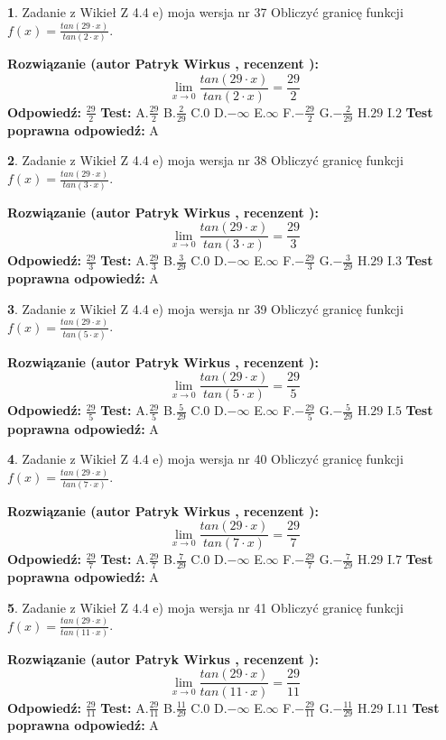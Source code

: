 \documentclass[12pt, a4paper]{article}
\theoremstyle{definition} %
\newtheorem{zad}{}
\newcommand{\zadStart}[1]{\begin{zad}#1\newline}
\newcommand{\zadStop}{\end{zad}}
\newcommand{\rozwStart}[2]{\noindent \textbf{Rozwiązanie (autor #1 , recenzent #2): }\newline}
\newcommand{\rozwStop}{\newline}
\newcommand{\odpStart}{\noindent \textbf{Odpowiedź:}\newline}
\newcommand{\odpStop}{\newline}
\newcommand{\testStart}{\noindent \textbf{Test:}\newline}
\newcommand{\testStop}{\newline}
\newcommand{\kluczStart}{\noindent \textbf{Test poprawna odpowiedź:}\newline}
\newcommand{\kluczStop}{\newline}
\begin{document}
\zadStart{Zadanie z Wikieł Z 4.4 e) moja wersja nr 37}
Obliczyć granicę funkcji $f(x)=\frac{tan(29\cdot x)}{tan(2\cdot x)}$.
\zadStop
\rozwStart{Patryk Wirkus}{}
$$\lim\limits_{x\to 0}\frac{tan(29\cdot x)}{tan(2\cdot x)}=
\frac{29}{2}$$
\rozwStop
\odpStart
$\frac{29}{2}$
\odpStop
\testStart
A.$\frac{29}{2}$
B.$\frac{2}{29}$
C.$0$
D.$-\infty$
E.$\infty$
F.$-\frac{29}{2}$
G.$-\frac{2}{29}$
H.$29$
I.$2$
\testStop
\kluczStart
A
\kluczStop



\zadStart{Zadanie z Wikieł Z 4.4 e) moja wersja nr 38}
Obliczyć granicę funkcji $f(x)=\frac{tan(29\cdot x)}{tan(3\cdot x)}$.
\zadStop
\rozwStart{Patryk Wirkus}{}
$$\lim\limits_{x\to 0}\frac{tan(29\cdot x)}{tan(3\cdot x)}=
\frac{29}{3}$$
\rozwStop
\odpStart
$\frac{29}{3}$
\odpStop
\testStart
A.$\frac{29}{3}$
B.$\frac{3}{29}$
C.$0$
D.$-\infty$
E.$\infty$
F.$-\frac{29}{3}$
G.$-\frac{3}{29}$
H.$29$
I.$3$
\testStop
\kluczStart
A
\kluczStop



\zadStart{Zadanie z Wikieł Z 4.4 e) moja wersja nr 39}
Obliczyć granicę funkcji $f(x)=\frac{tan(29\cdot x)}{tan(5\cdot x)}$.
\zadStop
\rozwStart{Patryk Wirkus}{}
$$\lim\limits_{x\to 0}\frac{tan(29\cdot x)}{tan(5\cdot x)}=
\frac{29}{5}$$
\rozwStop
\odpStart
$\frac{29}{5}$
\odpStop
\testStart
A.$\frac{29}{5}$
B.$\frac{5}{29}$
C.$0$
D.$-\infty$
E.$\infty$
F.$-\frac{29}{5}$
G.$-\frac{5}{29}$
H.$29$
I.$5$
\testStop
\kluczStart
A
\kluczStop



\zadStart{Zadanie z Wikieł Z 4.4 e) moja wersja nr 40}
Obliczyć granicę funkcji $f(x)=\frac{tan(29\cdot x)}{tan(7\cdot x)}$.
\zadStop
\rozwStart{Patryk Wirkus}{}
$$\lim\limits_{x\to 0}\frac{tan(29\cdot x)}{tan(7\cdot x)}=
\frac{29}{7}$$
\rozwStop
\odpStart
$\frac{29}{7}$
\odpStop
\testStart
A.$\frac{29}{7}$
B.$\frac{7}{29}$
C.$0$
D.$-\infty$
E.$\infty$
F.$-\frac{29}{7}$
G.$-\frac{7}{29}$
H.$29$
I.$7$
\testStop
\kluczStart
A
\kluczStop



\zadStart{Zadanie z Wikieł Z 4.4 e) moja wersja nr 41}
Obliczyć granicę funkcji $f(x)=\frac{tan(29\cdot x)}{tan(11\cdot x)}$.
\zadStop
\rozwStart{Patryk Wirkus}{}
$$\lim\limits_{x\to 0}\frac{tan(29\cdot x)}{tan(11\cdot x)}=
\frac{29}{11}$$
\rozwStop
\odpStart
$\frac{29}{11}$
\odpStop
\testStart
A.$\frac{29}{11}$
B.$\frac{11}{29}$
C.$0$
D.$-\infty$
E.$\infty$
F.$-\frac{29}{11}$
G.$-\frac{11}{29}$
H.$29$
I.$11$
\testStop
\kluczStart
A
\kluczStop
\end{document}
